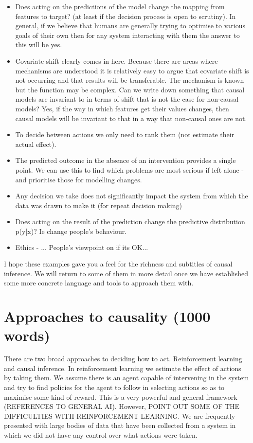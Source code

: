 \documentclass[11pt,a4paper,oneside]{book}
\theoremstyle{plain}
\theoremstyle{definition}
\begin{document}
\begin{itemize}
\item Does acting on the predictions of the model change the mapping from features to target? (at least if the decision process is open to scrutiny). In general, if we believe that humans are generally trying to optimise to various goals of their own then for any system interacting with them the answer to this will be yes.
\item 

 Covariate shift clearly comes in here. Because there are areas where mechanisms are understood it is relatively easy to argue that covariate shift is not occurring and that results will be transferable. The mechanism is known but the function may be complex. Can we write down something that causal models are invariant to in terms of shift that is not the case for non-causal models? Yes, if the way in which features get their values changes, then causal models will be invariant to that in a way that non-causal ones are not. 
 
\item To decide between actions we only need to rank them (not estimate their actual effect). 
\item The predicted outcome in the absence of an intervention provides a single point. We can use this to find which problems are most serious if left alone - and prioritise those for modelling changes. 
\item Any decision we take does not significantly impact the system from which the data was drawn to make it (for repeat decision making)
\item Does acting on the result of the prediction change the predictive distribution p(y|x)? Ie change people's behaviour.
\item Ethics - ... People's viewpoint on if its OK...
\end{itemize}

I hope these examples gave you a feel for the richness and subtitles of causal inference. We will return to some of them in more detail once we have established some more concrete language and tools to approach them with.



\section{Approaches to causality (1000 words)}

There are two broad approaches to deciding how to act. Reinforcement learning and causal inference. In reinforcement learning we estimate the effect of actions by taking them. We assume there is an agent capable of intervening in the system and try to find policies for the agent to follow in selecting actions so as to maximise some kind of reward. This is a very powerful and general framework (REFERENCES TO GENERAL AI). However, POINT OUT SOME OF THE DIFFICULTIES WITH REINFORCEMENT LEARNING. We are frequently presented with large bodies of data that have been collected from a system in which we did not have any control over what actions were taken. 
\end{document}
